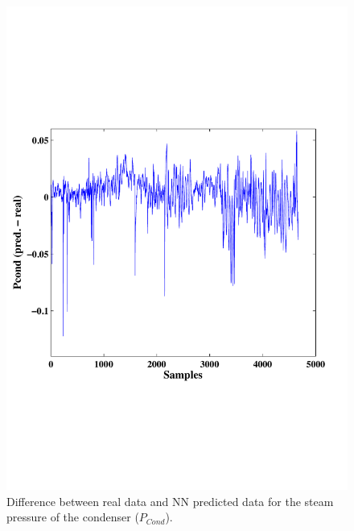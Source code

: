 \begin{figure}
\centering
\includegraphics[width=1\textwidth]{figures/Pconddiff.pdf}
\caption{Difference between real data and NN predicted data for the steam pressure of the condenser  ($P_{Cond}$).}
\label{Pcond}
\end{figure}

